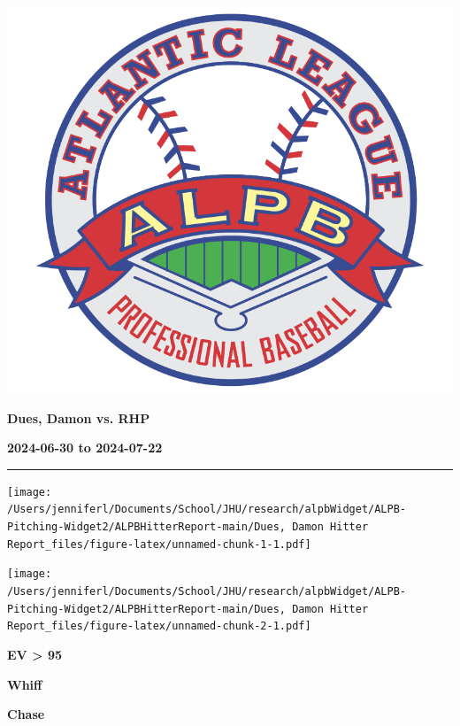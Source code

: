 \documentclass[
]{article}
\author{}
\date{\vspace{-2.5em}2025-02-16}
\begin{document}
\begin{multicols}{3} %

\includegraphics[width=0.4\columnwidth]{ALPB_Logo} %

\hspace{0pt}
\vfill
\hspace{-0.5in}\large\textbf{Dues, Damon vs. RHP} %
\vfill
\hspace{0pt}

\hspace{0pt}
\vfill
\large\textbf{2024-06-30 to 2024-07-22} %
\vfill
\hspace{0pt}

\end{multicols}
\vspace{-0.35in}

\noindent

\rule{\textwidth}{0.75pt}

\texttt{[image: /Users/jenniferl/Documents/School/JHU/research/alpbWidget/ALPB-Pitching-Widget2/ALPBHitterReport-main/Dues, Damon Hitter Report\_files/figure-latex/unnamed-chunk-1-1.pdf]}

\texttt{[image: /Users/jenniferl/Documents/School/JHU/research/alpbWidget/ALPB-Pitching-Widget2/ALPBHitterReport-main/Dues, Damon Hitter Report\_files/figure-latex/unnamed-chunk-2-1.pdf]}

\begin{multicols}{3} %



\hspace{0.2in}\centerline{\LARGE\textbf{EV > 95}}



\hspace{-0.05in}\centerline{\LARGE\textbf{Whiff}}



\hspace{-0.05in}\centerline{\LARGE\textbf{Chase}}
\end{multicols}
\end{document}
